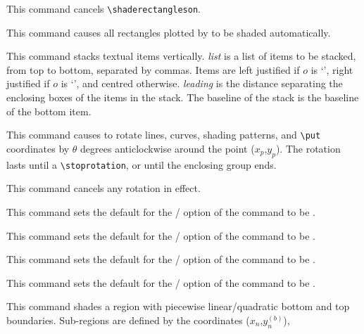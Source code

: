 \begin{syntax}
This command cancels \verb+\shaderectangleson+.
\item[\tt\bsl shaderectangleson]
This command causes all rectangles plotted by \PiCTeX{} to be shaded
automatically.
\item[{\tt\bsl stack {\rm[}[$o$]{\rm]}
{\rm[}<\emph{leading}>{\rm]}\{\emph{list}\}}]
This command stacks textual items vertically. \emph{list} is a list of items
to be stacked, from top to bottom, separated by commas. Items are left
justified if $o$ is `', right justified if $o$ is `', and
centred otherwise. \emph{leading} is the distance separating the enclosing
boxes of the items in the stack. The baseline of the stack is the baseline of
the bottom item.
\item[{\tt\bsl startrotation {\rm[}by $\cos(\theta)$ $\sin(\theta)${\rm]}
{\rm[}about $x_p$ $y_p${\rm]}}]
This command causes \PiCTeX{} to rotate lines, curves, shading patterns, and
\verb+\put+ coordinates by $\theta$ degrees anticlockwise around the point
($x_p$,$y_p$). The rotation lasts until a \verb+\stoprotation+, or until the
enclosing group ends.
\item[\tt\bsl stoprotation]
This command cancels any rotation in effect.
\item[\tt\bsl ticksin]
This command sets the default for the /
option of the  command to be .
\item[\tt\bsl ticksout]
This command sets the default for the /
option of the  command to be .
\item[\tt\bsl unloggedticks]
This command sets the default for the /
option of the  command to be .
\item[\tt\bsl visibleaxes]
This command sets the default for the /
option of the  command to be .
\item[{\tt\linestack[l]{\bsl vshade $x_0$ $y_0^{(b)}$ $y_0^{(t)}$ \ldots\
{\rm[}<$\epsilon_{l;i}$,$\epsilon_{r;i}$,$\epsilon_{d;i}$,$\epsilon_{u;i}$>{\rm]}
$x_i$ $y_i^{(b)}$ $y_i^{(t)}$ \ldots\ /\\
\bsl vshade $x_0$ $y_0^{(b)}$ $y_0^{(t)}$ \ldots\
{\rm[}<$\epsilon_{l;i}$,$\epsilon_{r;i}$,$\epsilon_{d;i}$,$\epsilon_{u;i}$>{\rm]}
$x_{2i-1}$ $y_{2i-1}^{(b)}$ $y_{2i-1}^{(t)}$ $x_{2i}$ $y_{2i}^{(b)}$
$y_{2i}^{(t)}$ \ldots\ /}}]
This command shades a region with piecewise linear/quadratic bottom and top
boundaries. Sub-regions are defined by the coordinates ($x_n$,$y_n^{(b)}$),

\end{syntax}
